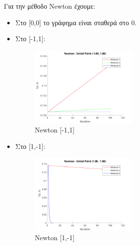 \documentclass{report}
\begin{document}
Για την μέθοδο Newton έχουμε:
\begin{itemize}
    \item Στο [0,0] το γράφημα είναι σταθερά στο 0.
    \item Στο [-1,1]:
    \begin{figure}[H]
        \centering
        \includegraphics[width=0.5\textwidth]{media/newton-11.png}
        \caption{Newton [-1,1]}
    \end{figure}
    \item Στο [1,-1]:
    \begin{figure}[H]
        \centering
        \includegraphics[width=0.5\textwidth]{media/newton1-1.png}
        \caption{Newton [1,-1]}
    \end{figure}
\end{itemize}
\end{document}
